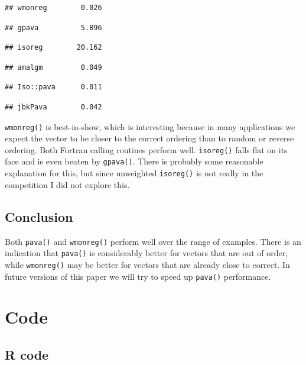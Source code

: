 \documentclass[12pt,]{article}
\begin{document}
\begin{verbatim}
## wmonreg        0.026
\end{verbatim}

\begin{verbatim}
## gpava          5.896
\end{verbatim}

\begin{verbatim}
## isoreg        20.162
\end{verbatim}

\begin{verbatim}
## amalgm         0.049
\end{verbatim}

\begin{verbatim}
## Iso::pava      0.011
\end{verbatim}

\begin{verbatim}
## jbkPava        0.042
\end{verbatim}

\texttt{wmonreg()} is best-in-show, which is interesting because in many
applications we expect the vector to be closer to the correct ordering
than to random or reverse ordering. Both Fortran calling routines
perform well. \texttt{isoreg()} falls flat on its face and is even
beaten by \texttt{gpava()}. There is probably some reasonable
explanation for this, but since unweighted \texttt{isoreg()} is not
really in the competition I did not explore this.

\subsection{Conclusion}\label{conclusion}

Both \texttt{pava()} and \texttt{wmonreg()} perform well over the range
of examples. There is an indication that \texttt{pava()} is considerably
better for vectors that are out of order, while \texttt{wmonreg()} may
be better for vectors that are already close to correct. In future
versions of this paper we will try to speed up \texttt{pava()}
performance.

\section{Code}\label{code}

\subsection{R code}\label{r-code}
\end{document}
